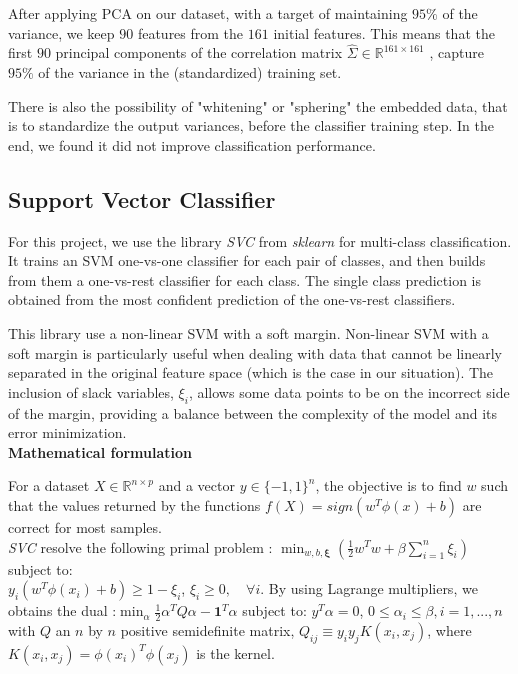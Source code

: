 \documentclass[twocolumn]{article}
\newcommand{\R}{\mathbb{R}}
\begin{document}
After applying PCA on our dataset, with a target of maintaining $95\%$ of the variance, we keep $90$ features from the $161$ initial features. This means that the first $90$ principal components of the correlation matrix $\hat{\Sigma} \in \mathbb{R}^{161 \times 161}$ , capture $95\%$ of the variance in the (standardized) training set.

There is also the possibility of "whitening" or "sphering" the embedded data, that is to standardize the output variances, before the classifier training step. In the end, we found it did not improve classification performance.

\subsection{Support Vector Classifier}
For this project, we use the library \textit{SVC} from \textit{sklearn} for multi-class classification. It trains an SVM one-vs-one classifier for each pair of classes, and then builds from them a one-vs-rest classifier for each class. The single class prediction is obtained from the most confident prediction of the one-vs-rest classifiers. 

This library use a non-linear SVM with a soft margin. Non-linear SVM with a soft margin is particularly useful when dealing with data that cannot be linearly separated in the original feature space (which is the case in our situation). The inclusion of slack variables, \(\xi_i\), allows some data points to be on the incorrect side of the margin, providing a balance between the complexity of the model and its error minimization.\\

\textbf{Mathematical formulation}

For a dataset $X \in \R^{n \times p}$ and a vector $y \in \{-1, 1\}^n$, the objective is to find $w$ such that the values returned by the functions $f(X) = sign(w^T\phi(x) + b)$ are correct for most samples.\\
\textit{SVC} resolve the following primal problem : \(\displaystyle
\min_{w, b, \boldsymbol{\xi}} \left( \frac{1}{2} w^T w + \beta \sum_{i=1}^{n} \xi_i \right)
\) 
subject to:\\
\( y_i (w^T \phi(x_i) + b) \geq 1 - \xi_i\), \(\xi_i \geq 0, \quad \forall i\).
By using Lagrange multipliers, we obtains the dual :\(\displaystyle \min_{\alpha} \frac{1}{2} \alpha^T Q \alpha - \mathbf{1}^T \alpha
\) subject to: \(y^T \alpha = 0\), \(0 \leq \alpha_i \leq \beta, i=1,...,n\) with $Q$ an $n$ by $n$ positive semidefinite matrix, $Q_{ij} \equiv y_iy_jK(x_i, x_j)$, where $K(x_i, x_j) = \phi(x_i)^T\phi(x_j)$ is the kernel. 
\end{document}
